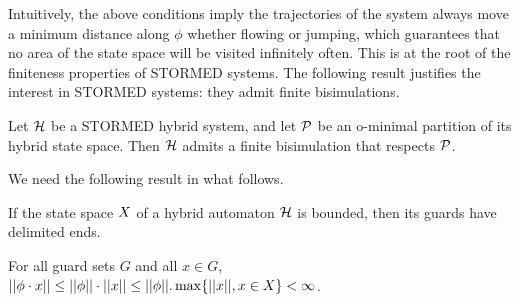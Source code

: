 Intuitively, the above conditions imply the trajectories of the system always move a minimum distance along $\phi$ whether flowing or jumping, which guarantees that no area of the state space will be visited infinitely often. 
This is at the root of the finiteness properties of STORMED systems.
%
The following result justifies the interest in STORMED systems: they admit finite bisimulations.
\begin{thm}\cite{VladimerouPVD08_STORMED}
	\label{thm:stormed finite bisimu}	
	Let $\mathcal{H}$ be a STORMED hybrid system, and let $\mathcal{P}$ be an o-minimal partition of its hybrid state space. 
	Then $\mathcal{H}$ admits a finite bisimulation that respects $\mathcal{P}$.
\end{thm}
We need the following result in what follows.
\begin{prop}
	\label{prop:ED}
	If the state space $X$ of a hybrid automaton $\mathcal{H}$ is bounded, then its guards have delimited ends.
\end{prop}
\begin{prf}
	For all guard sets $G$ and all $x \in G$, $||\phi \cdot x || \leq ||\phi|| \cdot ||x|| \leq ||\phi||.\max\{||x||, x\in X \} < \infty$.
\end{prf}
